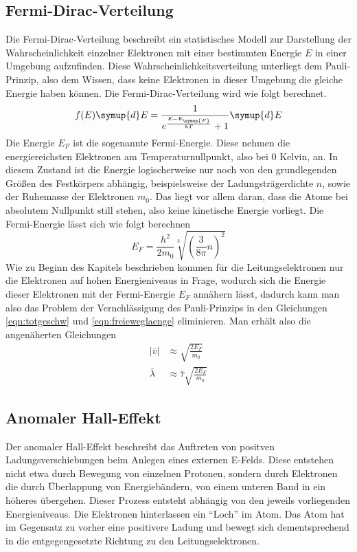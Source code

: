 \subsection{Fermi-Dirac-Verteilung}
\label{sec:fermidirac}
Die Fermi-Dirac-Verteilung beschreibt ein statistisches Modell zur Darstellung der Wahrscheinlichkeit einzelner Elektronen mit einer bestimmten Energie $E$
in einer Umgebung aufzufinden. Diese Wahrscheinlichkeitsverteilung unterliegt dem Pauli-Prinzip, also dem Wissen, dass keine Elektronen in dieser Umgebung die gleiche Energie haben können.
Die Fermi-Dirac-Verteilung wird wie folgt berechnet.
\begin{equation}
\label{eqn:fermidiraceq}
f(E)\symup{d}E = \frac{1}{e^{\frac{E-E_{\symup{F}}}{kT}}+1} \symup{d}E
\end{equation}
Die Energie $E_{F}$ ist die sogenannte Fermi-Energie. Diese nehmen die energiereichsten Elektronen am Temperaturnullpunkt, also bei 0 Kelvin, an. 
In diesem Zustand ist die Energie logischerweise nur noch von den grundlegenden Größen des Festkörpers abhängig, beispielsweise der Ladungsträgerdichte $n$, sowie der Ruhemasse der Elektronen $m_{0}$.
Das liegt vor allem daran, dass die Atome bei absolutem Nullpunkt still stehen, also keine kinetische Energie vorliegt.
Die Fermi-Energie lässt sich wie folgt berechnen
\begin{equation}
\label{eqn:fermienergie}
E_{F} = \frac{h^{2}}{2 m_{0}} \sqrt[3]{\left( \frac{3}{8\pi} n \right)^{2}}
\end{equation}
Wie zu Beginn des Kapitels beschrieben kommen für die Leitungselektronen nur die Elektronen auf hohen Energieniveaus in Frage, wodurch sich die Energie dieser Elektronen
mit der Fermi-Energie $E_{F}$ annähern lässt, dadurch kann man also das Problem der Vernchlässigung des Pauli-Prinzips in den Gleichungen \eqref{eqn:totgeschw} und \eqref{eqn:freieweglaenge} eliminieren.
Man erhält also die angenäherten Gleichungen
\begin{align}
\lvert \bar{v} \rvert &\approx \sqrt{\frac{2 E_{F}}{m_{0}}} \\
\bar{\lambda} &\approx \bar{\tau} \sqrt{\frac{2 E_{F}}{m_{0}}}
\end{align}

\subsection{Anomaler Hall-Effekt}
Der anomaler Hall-Effekt beschreibt das Auftreten von positven Ladungsverschiebungen beim Anlegen eines externen E-Felds. Diese entstehen nicht etwa durch Bewegung von einzelnen Protonen, sondern durch Elektronen
die durch Überlappung von Energiebändern, von einem unteren Band in ein höheres übergehen. Dieser Prozess entsteht abhängig von den jeweils vorliegenden Energieniveaus.
Die Elektronen hinterlassen ein \enquote{Loch} im Atom. Das Atom hat im Gegensatz zu vorher eine positivere Ladung und bewegt sich dementsprechend in die entgegengesetzte Richtung zu den Leitungselektronen.